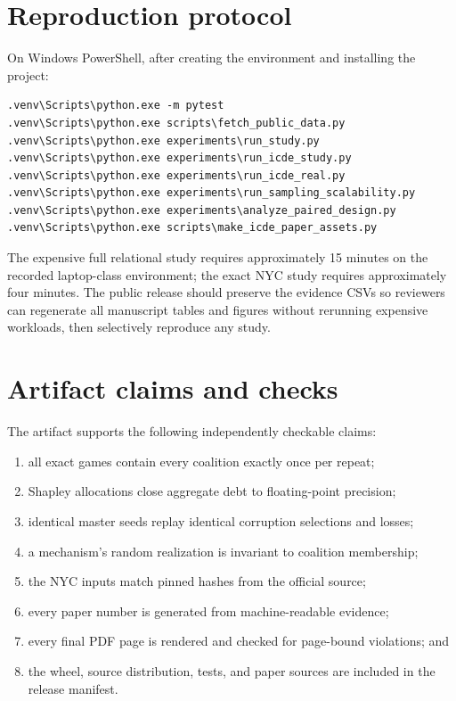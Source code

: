 \documentclass[conference]{IEEEtran}
\begin{document}
\section{Reproduction protocol}

On Windows PowerShell, after creating the environment and installing the project:

{\scriptsize
\begin{verbatim}
.venv\Scripts\python.exe -m pytest
.venv\Scripts\python.exe scripts\fetch_public_data.py
.venv\Scripts\python.exe experiments\run_study.py
.venv\Scripts\python.exe experiments\run_icde_study.py
.venv\Scripts\python.exe experiments\run_icde_real.py
.venv\Scripts\python.exe experiments\run_sampling_scalability.py
.venv\Scripts\python.exe experiments\analyze_paired_design.py
.venv\Scripts\python.exe scripts\make_icde_paper_assets.py
\end{verbatim}
}

The expensive full relational study requires approximately 15 minutes on the recorded laptop-class environment; the exact NYC study requires approximately four minutes. The public release should preserve the evidence CSVs so reviewers can regenerate all manuscript tables and figures without rerunning expensive workloads, then selectively reproduce any study.

\section{Artifact claims and checks}

The artifact supports the following independently checkable claims:

\begin{enumerate}
  \item all exact games contain every coalition exactly once per repeat;
  \item Shapley allocations close aggregate debt to floating-point precision;
  \item identical master seeds replay identical corruption selections and losses;
  \item a mechanism's random realization is invariant to coalition membership;
  \item the NYC inputs match pinned hashes from the official source;
  \item every paper number is generated from machine-readable evidence;
  \item every final PDF page is rendered and checked for page-bound violations; and
  \item the wheel, source distribution, tests, and paper sources are included in the release manifest.
\end{enumerate}
\end{document}
